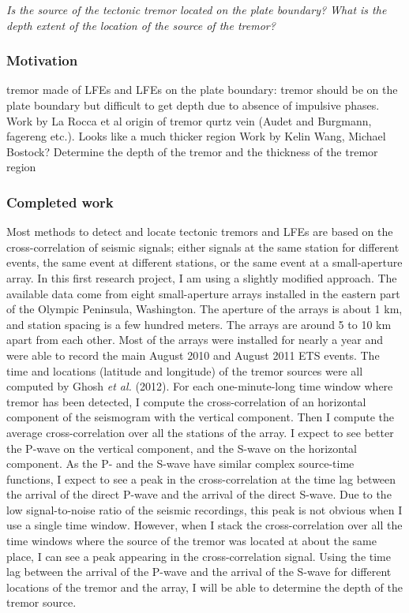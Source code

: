 \documentclass[letterpaper, 12pt]{article}
\begin{document}
\textit{Is the source of the tectonic tremor located on the plate boundary? What is the depth extent of the location of the source of the tremor?}

\subsubsection*{Motivation}

tremor made of LFEs and LFEs on the plate boundary: tremor should be on the plate boundary but difficult to get depth due to absence of impulsive phases. 
Work by La Rocca et al
origin of tremor qurtz vein (Audet and Burgmann, fagereng etc.). Looks like a much thicker region
Work by Kelin Wang, Michael Bostock?
Determine the depth of the tremor and the thickness of the tremor region

\subsubsection*{Completed work}

Most methods to detect and locate tectonic tremors and LFEs are based on the cross-correlation of seismic signals; either signals at the same station for different events, the same event at different stations, or the same event at a small-aperture array. In this first research project, I am using a slightly modified approach. The available data come from eight small-aperture arrays installed in the eastern part of the Olympic Peninsula, Washington. The aperture of the arrays is about 1 km, and station spacing is a few hundred meters. The arrays are around 5 to 10 km apart from each other. Most of the arrays were installed for nearly a year and were able to record the main August 2010 and August 2011 ETS events. The time and locations (latitude and longitude) of the tremor sources were all computed by Ghosh \textit{et al.} (2012). For each one-minute-long time window where tremor has been detected, I compute the cross-correlation of an horizontal component of the seismogram with the vertical component. Then I compute the average cross-correlation over all the stations of the array. I expect to see better the P-wave on the vertical component, and the S-wave on the horizontal component. As the P- and the S-wave have similar complex source-time functions, I expect to see a peak in the cross-correlation at the time lag between the arrival of the direct P-wave and the arrival of the direct S-wave. Due to the low signal-to-noise ratio of the seismic recordings, this peak is not obvious when I use a single time window. However, when I stack the cross-correlation over all the time windows where the source of the tremor was located at about the same place, I can see a peak appearing in the cross-correlation signal. Using the time lag between the arrival of the P-wave and the arrival of the S-wave for different locations of the tremor and the array, I will be able to determine the depth of the tremor source.
\end{document}
